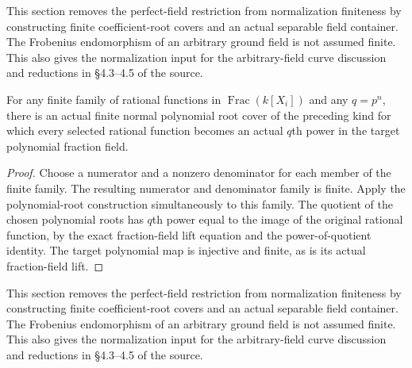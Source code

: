 \endgroup

\begingroup

This section removes the perfect-field restriction from normalization
finiteness by constructing finite coefficient-root covers and an actual
separable field container. The Frobenius endomorphism of an arbitrary
ground field is not assumed finite. This also gives the normalization
input for the arbitrary-field curve discussion and reductions in
\S4.3--4.5 of the source.

\begin{lemma}
\label{lem:normalization-finite-rational-family-roots}
\leanok
For any finite family of rational functions in
$\operatorname{Frac}(k[X_i])$ and any $q=p^n$, there is an actual
finite normal polynomial root cover of the preceding kind for which
every selected rational function becomes an actual $q$th power in
the target polynomial fraction field.
\end{lemma}
\begin{proof}
Choose a numerator and a nonzero denominator for each member of the
finite family. The resulting numerator and denominator family is
finite. Apply the polynomial-root construction simultaneously to
this family. The quotient of the chosen polynomial roots has
$q$th power equal to the image of the original rational function,
by the exact fraction-field lift equation and the power-of-quotient
identity. The target polynomial map is injective and finite, as is
its actual fraction-field lift.
\end{proof}

\endgroup

\begingroup

This section removes the perfect-field restriction from normalization
finiteness by constructing finite coefficient-root covers and an actual
separable field container. The Frobenius endomorphism of an arbitrary
ground field is not assumed finite. This also gives the normalization
input for the arbitrary-field curve discussion and reductions in
\S4.3--4.5 of the source.

